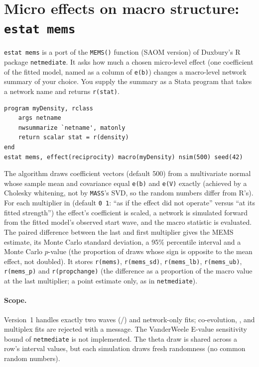 \section{Micro effects on macro structure: \texttt{estat mems}}
\texttt{estat mems} is a port of the \texttt{MEMS()} function (SAOM version) of Duxbury's R package \texttt{netmediate}. It asks how much a chosen micro-level effect (one coefficient of the fitted model, named as a column of \texttt{e(b)}) changes a macro-level network summary of your choice. You supply the summary as a Stata program that takes a network name and returns \texttt{r(stat)}.
\begin{lstlisting}
program myDensity, rclass
    args netname
    nwsummarize `netname', matonly
    return scalar stat = r(density)
end
estat mems, effect(reciprocity) macro(myDensity) nsim(500) seed(42)
\end{lstlisting}
The algorithm draws  coefficient vectors (default 500) from a multivariate normal whose sample mean and covariance equal \texttt{e(b)} and \texttt{e(V)} exactly (achieved by a Cholesky whitening, not by \texttt{MASS}'s SVD, so the random numbers differ from R's). For each multiplier in  (default \texttt{0 1}: ``as if the effect did not operate'' versus ``at its fitted strength'') the effect's coefficient is scaled, a network is simulated forward from the fitted model's observed start wave, and the macro statistic is evaluated. The paired difference between the last and first multiplier gives the MEMS estimate, its Monte Carlo standard deviation, a 95\% percentile interval and a Monte Carlo $p$-value (the proportion of draws whose sign is opposite to the mean effect, not doubled). It stores \texttt{r(mems)}, \texttt{r(mems\_sd)}, \texttt{r(mems\_lb)}, \texttt{r(mems\_ub)}, \texttt{r(mems\_p)} and \texttt{r(propchange)} (the difference as a proportion of the macro value at the last multiplier; a point estimate only, as in \texttt{netmediate}).

\paragraph{Scope.} Version~1 handles exactly two waves (/) and network-only fits; co-evolution, ,  and multiplex fits are rejected with a message. The VanderWeele E-value sensitivity bound of \texttt{netmediate} is not implemented. The theta draw is shared across a row's interval values, but each simulation draws fresh randomness (no common random numbers).

